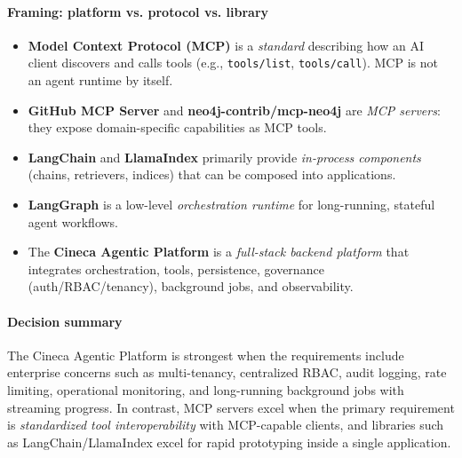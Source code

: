 \paragraph{Framing: platform vs. protocol vs. library}
\begin{itemize}
    \item \textbf{Model Context Protocol (MCP)} is a \emph{standard} describing how an AI client discovers and calls tools (e.g., \texttt{tools/list}, \texttt{tools/call}). MCP is not an agent runtime by itself.
    \item \textbf{GitHub MCP Server} and \textbf{neo4j-contrib/mcp-neo4j} are \emph{MCP servers}: they expose domain-specific capabilities as MCP tools.
    \item \textbf{LangChain} and \textbf{LlamaIndex} primarily provide \emph{in-process components} (chains, retrievers, indices) that can be composed into applications.
    \item \textbf{LangGraph} is a low-level \emph{orchestration runtime} for long-running, stateful agent workflows.
    \item The \textbf{Cineca Agentic Platform} is a \emph{full-stack backend platform} that integrates orchestration, tools, persistence, governance (auth/RBAC/tenancy), background jobs, and observability.
\end{itemize}

\paragraph{Decision summary}
The Cineca Agentic Platform is strongest when the requirements include enterprise concerns
such as multi-tenancy, centralized RBAC, audit logging, rate limiting, operational monitoring,
and long-running background jobs with streaming progress. In contrast, MCP servers excel when
the primary requirement is \emph{standardized tool interoperability} with MCP-capable clients,
and libraries such as LangChain/LlamaIndex excel for rapid prototyping inside a single application.

